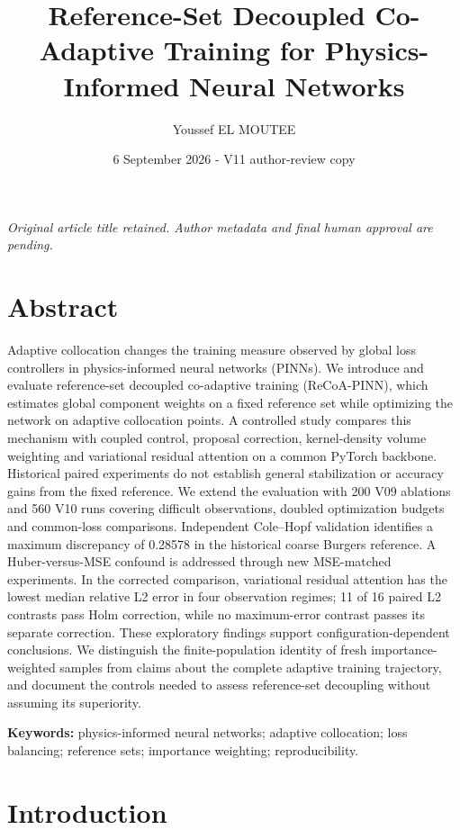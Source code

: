 \documentclass[
  11pt,
]{article}
\title{Reference-Set Decoupled Co-Adaptive Training for Physics-Informed
Neural Networks}
\author{Youssef EL MOUTEE}
\date{6 September 2026 - V11 author-review copy}
\begin{document}
\maketitle

\emph{Original article title retained. Author metadata and final human
approval are pending.}

\hypertarget{abstract}{%
\section*{Abstract}\label{abstract}}

Adaptive collocation changes the training measure observed by global
loss controllers in physics-informed neural networks (PINNs). We
introduce and evaluate reference-set decoupled co-adaptive training
(ReCoA-PINN), which estimates global component weights on a fixed
reference set while optimizing the network on adaptive collocation
points. A controlled study compares this mechanism with coupled control,
proposal correction, kernel-density volume weighting and variational
residual attention on a common PyTorch backbone. Historical paired
experiments do not establish general stabilization or accuracy gains
from the fixed reference. We extend the evaluation with 200 V09
ablations and 560 V10 runs covering difficult observations, doubled
optimization budgets and common-loss comparisons. Independent Cole--Hopf
validation identifies a maximum discrepancy of 0.28578 in the historical
coarse Burgers reference. A Huber-versus-MSE confound is addressed
through new MSE-matched experiments. In the corrected comparison,
variational residual attention has the lowest median relative L2 error
in four observation regimes; 11 of 16 paired L2 contrasts pass Holm
correction, while no maximum-error contrast passes its separate
correction. These exploratory findings support configuration-dependent
conclusions. We distinguish the finite-population identity of fresh
importance-weighted samples from claims about the complete adaptive
training trajectory, and document the controls needed to assess
reference-set decoupling without assuming its superiority.

\textbf{Keywords:} physics-informed neural networks; adaptive
collocation; loss balancing; reference sets; importance weighting;
reproducibility.

\hypertarget{introduction}{%
\section{Introduction}\label{introduction}}
\end{document}
